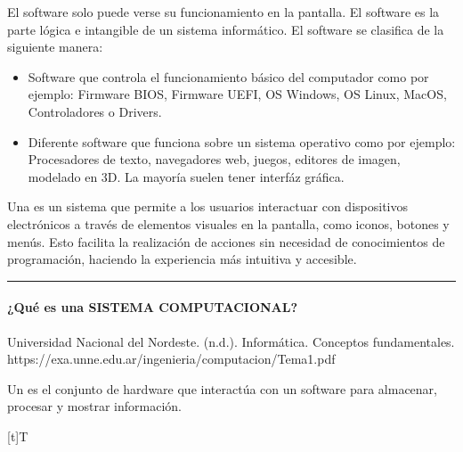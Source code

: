 \documentclass[letterpaper,10pt,spanish]{sphinxmanual}
\let\sphinxpxdimen\pdfpxdimen\else\newdimen\sphinxpxdimen
\begin{document}
\sphinxAtStartPar
El software solo puede verse su funcionamiento en la pantalla. El software es la parte lógica e intangible de un sistema informático. El software se clasifica de la siguiente manera:
\begin{itemize}
\item {} 
\sphinxAtStartPar
{} Software que controla el funcionamiento básico del computador como por ejemplo: Firmware BIOS, Firmware UEFI, OS Windows, OS Linux, MacOS, Controladores o Drivers.

\item {} 
\sphinxAtStartPar
{} Diferente software que funciona sobre un sistema operativo como por ejemplo: Procesadores de texto, navegadores web, juegos, editores de imagen, modelado en 3D. La mayoría suelen tener interfáz gráfica.

\end{itemize}

\sphinxAtStartPar
Una  es un sistema que permite a los usuarios interactuar con dispositivos electrónicos a través de elementos visuales en la pantalla, como iconos, botones y menús. Esto facilita la realización de acciones sin necesidad de conocimientos de programación, haciendo la experiencia más intuitiva y accesible.


\bigskip\hrule\bigskip



\paragraph{¿Qué es una SISTEMA COMPUTACIONAL?}
\label{\detokenize{cursos/logica8/recursos/T01:que-es-una-sistema-computacional}}
\sphinxAtStartPar
%
\begin{footnote}[2]\sphinxAtStartFootnote
Universidad Nacional del Nordeste. (n.d.). Informática. Conceptos fundamentales. https://exa.unne.edu.ar/ingenieria/computacion/Tema1.pdf
%
\end{footnote} Un  es el conjunto de hardware que interactúa con un software para almacenar, procesar y mostrar información.


\begin{savenotes}\sphinxattablestart
\sphinxthistablewithglobalstyle
\centering
\begin{tabulary}{\linewidth}[t]{T}
\sphinxtoprule
\sphinxtableatstartofbodyhook

\begin{sphinxfigure-in-table}
\centering
\capstart
\noindent\sphinxincludegraphics[width=300\sphinxpxdimen]{{image041}.png}
\label{\detokenize{cursos/logica8/recursos/T01:id16}}\end{sphinxfigure-in-table}\relax
\\
\sphinxbottomrule
\end{tabulary}
\sphinxtableafterendhook\par
\sphinxattableend\end{savenotes}
\end{document}
